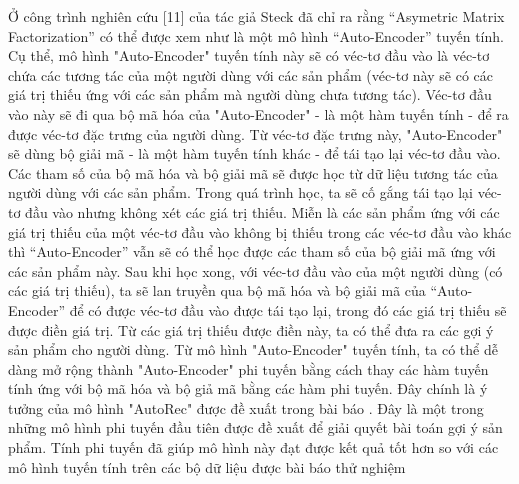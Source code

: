 Ở công trình nghiên cứu [11] của tác giả Steck đã chỉ ra rằng “Asymetric Matrix Factorization” có thể được xem như là một mô hình “Auto-Encoder” tuyến tính. 
Cụ thể, mô hình "Auto-Encoder" tuyến tính này sẽ có véc-tơ đầu vào là véc-tơ chứa các tương tác của một người dùng với các sản phẩm (véc-tơ này sẽ có các giá trị thiếu ứng với các sản phẩm mà người dùng chưa tương tác). 
Véc-tơ đầu vào này sẽ đi qua bộ mã hóa của "Auto-Encoder" - là một hàm tuyến tính - để ra được véc-tơ đặc trưng của người dùng. 
Từ véc-tơ đặc trưng này, "Auto-Encoder" sẽ dùng bộ giải mã - là một hàm tuyến tính khác - để tái tạo lại véc-tơ đầu vào. 
Các tham số của bộ mã hóa và bộ giải mã sẽ được học từ dữ liệu tương tác của người dùng với các sản phẩm. 
Trong quá trình học, ta sẽ cố gắng tái tạo lại véc-tơ đầu vào nhưng không xét các giá trị thiếu. 
Miễn là các sản phẩm ứng với các giá trị thiếu của một véc-tơ đầu vào không bị thiếu trong các véc-tơ đầu vào khác thì ``Auto-Encoder'' vẫn sẽ có thể học được các tham số của bộ giải mã ứng với các sản phẩm này. 
Sau khi học xong, với véc-tơ đầu vào của một người dùng (có các giá trị thiếu), ta sẽ lan truyền qua bộ mã hóa và bộ giải mã của ``Auto-Encoder'' để có được véc-tơ đầu vào được tái tạo lại, trong đó các giá trị thiếu sẽ được điền giá trị. 
Từ các giá trị thiếu được điền này, ta có thể đưa ra các gợi ý sản phẩm cho người dùng. 
Từ mô hình "Auto-Encoder" tuyến tính, ta có thể dễ dàng mở rộng thành "Auto-Encoder" phi tuyến bằng cách thay các hàm tuyến tính ứng với bộ mã hóa và bộ giả mã bằng các hàm phi tuyến. 
Đây chính là ý tưởng của mô hình "AutoRec" được đề xuất trong bài báo \cite{autorec}. 
Đây là một trong những mô hình phi tuyến đầu tiên được đề xuất để giải quyết bài toán gợi ý sản phẩm. 
Tính phi tuyến đã giúp mô hình này đạt được kết quả tốt hơn so với các mô hình tuyến tính trên các bộ dữ liệu được bài báo thử nghiệm


